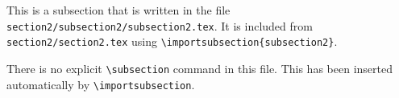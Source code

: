 This is a subsection that is written in the file
\texttt{section2/subsection2/subsection2.tex}.
It is included from \texttt{section2/section2.tex} using
\texttt{\textbackslash importsubsection\{subsection2\}}.

There is no explicit \texttt{\textbackslash subsection} command in this file.
This has been inserted automatically by \texttt{\textbackslash importsubsection}.
